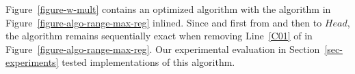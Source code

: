 Figure~\ref{figure-w-mult} contains an optimized \NCWSM algorithm with the \RangeMaxReg algorithm in Figure~\ref{figure-algo-range-max-reg} inlined. Since \Take and \Steal first \RMaxR from and then \RMaxW to \(Head\), the algorithm remains sequentially exact when removing Line~\ref{C01} of \RMaxW in Figure~\ref{figure-algo-range-max-reg}. Our experimental evaluation in Section~\ref{sec-experiments} tested implementations of this algorithm.